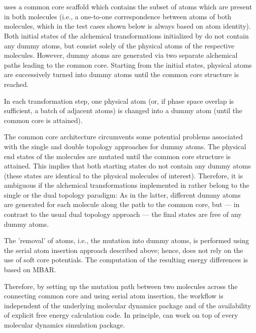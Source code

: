 \chapter{{\trafo} }

{\trafo} uses a common core scaffold which contains the subset of atoms which are present in both molecules (i.e., a one-to-one correspondence between
atoms of both molecules, which in the test cases shown below is always
based on atom identity). Both initial states of the alchemical transformations initialized by {\trafo} do not contain any dummy atoms, but consist solely of the physical atoms of the respective molecules. However, dummy atoms are generated via two separate alchemical paths leading to the common core. Starting from the initial states, physical atoms are successively turned into dummy atoms until the common core structure is reached. 

In each transformation step, one physical atom (or, if phase space
overlap is sufficient, a batch of adjacent atoms) is changed into
a dummy atom (until the common core is attained).

The common core architecture circumvents some potential problems
associated with the single and double topology approaches for dummy
atoms. The physical end states of the molecules are mutated until the
common core structure is attained. This implies that both starting states
do not contain any dummy atoms (these states are identical to the
physical molecules of interest). Therefore, it is ambiguous if the
alchemical transformations implemented in {\trafo} rather belong
to the single or the dual topology paradigm: As in the latter, different
dummy atoms are generated for each molecule along the path to the
common core, but --- in contrast to the usual dual topology approach
--- the final states are free of any dummy atoms. 

The 'removal' of atoms, i.e., the mutation into dummy atoms, is performed
using the serial atom insertion approach described above; hence, {\trafo}
does not rely on the use of soft core potentials. The computation
of the resulting energy differences is based on MBAR.

Therefore, by setting up the mutation path between two molecules across
the connecting common core and using serial atom
insertion, the {\trafo} workflow is independent of the underlying
molecular dynamics package and of the availability of explicit free energy
calculation code. In principle, {\trafo} can work on top of every
molecular dynamics simulation package.

